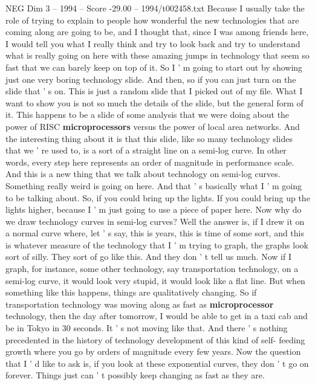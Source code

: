 \begin{textsample}{NEG Dim 3 – 1994 – Score -29.00 – 1994/t002458.txt}  \label{ex:f3_neg_001}
Because I usually take the role of trying to explain to people how wonderful the new technologies that are coming along are going to be, and I thought that, since I was among friends here, I would tell you what I really think and try to look back and try to understand what is really going on here with these amazing jumps in technology that seem so fast that we can barely keep on top of it.
So I ' m going to start out by showing just one very boring technology slide.
And then, so if you can just turn on the slide that ' s on.
This is just a random slide that I picked out of my file.
What I want to show you is not so much the details of the slide, but the general form of it.
This happens to be a slide of some analysis that we were doing about the power of RISC \textbf{microprocessors} versus the power of local area networks.
And the interesting thing about it is that this slide, like so many technology slides that we ' re used to, is a sort of a straight line on a semi-log curve.
In other words, every step here represents an order of magnitude in performance scale.
And this is a new thing that we talk about technology on semi-log curves.
Something really weird is going on here.
And that ' s basically what I ' m going to be talking about.
So, if you could bring up the lights.
If you could bring up the lights higher, because I ' m just going to use a piece of paper here.
Now why do we draw technology curves in semi-log curves?
Well the answer is, if I drew it on a normal curve where, let ' s say, this is years, this is time of some sort, and this is whatever measure of the technology that I ' m trying to graph, the graphs look sort of silly.
They sort of go like this.
And they don ' t tell us much.
Now if I graph, for instance, some other technology, say transportation technology, on a semi-log curve, it would look very stupid, it would look like a flat line.
But when something like this happens, things are qualitatively changing.
So if transportation technology was moving along as fast as \textbf{microprocessor} technology, then the day after tomorrow, I would be able to get in a taxi cab and be in Tokyo in 30 seconds.
It ' s not moving like that.
And there ' s nothing precedented in the history of technology development of this kind of self- feeding growth where you go by orders of magnitude every few years.
Now the question that I ' d like to ask is, if you look at these exponential curves, they don ' t go on forever.
Things just can ' t possibly keep changing as fast as they are.

\end{textsample}
